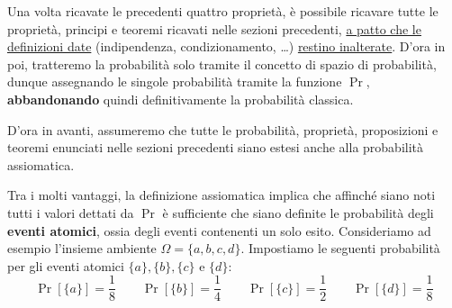 \documentclass[a4paper, 12pt]{report}
\begin{document}
    Una volta ricavate le precedenti quattro proprietà, è possibile ricavare tutte le proprietà, principi e teoremi ricavati nelle sezioni precedenti, \underline{a patto che le definizioni date} (indipendenza, condizionamento, \dots) \underline{restino inalterate}. D'ora in poi, tratteremo la probabilità solo tramite il concetto di spazio di probabilità, dunque assegnando le singole probabilità tramite la funzione $\Pr$, \textbf{abbandonando} quindi definitivamente la probabilità classica.

    \begin{framedobs}{}
        D'ora in avanti, assumeremo che tutte le probabilità, proprietà, proposizioni e teoremi enunciati nelle sezioni precedenti siano estesi anche alla probabilità assiomatica.
    \end{framedobs}

    Tra i molti vantaggi, la definizione assiomatica implica che affinché siano noti tutti i valori dettati da $\Pr$ è sufficiente che siano definite le probabilità degli \textbf{eventi atomici}, ossia degli eventi contenenti un solo esito. Consideriamo ad esempio l'insieme ambiente $\Omega = \{a,b,c,d\}$. Impostiamo le seguenti probabilità per gli eventi atomici $\{a\}, \{b\}, \{c\}$ e $\{d\}$:
    \[\Pr[\{a\}] = \frac{1}{8} \qquad \Pr[\{b\}] = \frac{1}{4} \qquad \Pr[\{c\}] = \frac{1}{2} \qquad \Pr[\{d\}] = \frac{1}{8}\]
\end{document}
